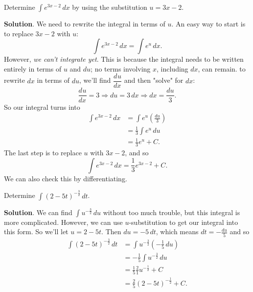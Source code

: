 \documentclass[10pt,]{book}
\theoremstyle{ptxplainnotitle}
\theoremstyle{ptxplaintitle}
\theoremstyle{ptxplainnotitle}
\theoremstyle{ptxplaintitle}
\theoremstyle{ptxplainnotitle}
\theoremstyle{ptxplaintitle}
\theoremstyle{ptxdefinitionnotitle}
\theoremstyle{ptxdefinitiontitle}
\theoremstyle{ptxdefinitionnotitle}
\theoremstyle{ptxdefinitiontitle}
\theoremstyle{ptxdefinitionnotitle}
\theoremstyle{ptxdefinitiontitle}
\theoremstyle{ptxdefinitionnotitle}
\theoremstyle{ptxdefinitiontitle}
\theoremstyle{ptxdefinitionnotitle}
\theoremstyle{ptxdefinitiontitle}
\numberwithin{equation}{section}
\newcommand{\dv}[3][]{\dfrac{d^{#1} #2}{d #3^{#1}}}
\begin{document}
%
\begin{example}\label{example-a-simple-substitution}
\hypertarget{p-481}{}%
Determine \(\int e^{3x - 2}\,dx\) by using the substitution \(u = 3x - 2\).%
\par\smallskip%
\noindent\textbf{Solution}.\hypertarget{solution-105}{}\quad%
\hypertarget{p-482}{}%
We need to rewrite the integral in terms of \(u\). An easy way to start is to replace \(3x-2\) with \(u\):%
\begin{equation*}
\int e^{3x-2}\,dx = \int e^{u}\,dx.
\end{equation*}
However, \emph{we can't integrate yet}. This is because the integral needs to be written entirely in terms of \(u\) and \(du\); no terms involving \(x\), including \(dx\), can remain. to rewrite \(dx\) in terms of \(du\), we'll find \(\dv{u}{x}\) and then "solve" for \(dx\):%
\begin{equation*}
\dv{u}{x} = 3 \Rightarrow du = 3\,dx \Rightarrow dx = \frac{du}{3}.
\end{equation*}
So our integral turns into%
\begin{align*}
\int e^{3x-2}\,dx & = \int e^{u}\left(\frac{du}{3}\right) \\
& = \frac{1}{3}\int e^{u}\,du \\
& = \frac{1}{3}e^{u} + C. 
\end{align*}
The last step is to replace \(u\) with \(3x-2\), and so%
\begin{equation*}
\int e^{3x-2}\,dx = \frac{1}{3}e^{3x-2} + C.
\end{equation*}
We can also check this by differentiating.%
\end{example}
\begin{example}\label{example-simplifying-an-integral-with-substitution}
\hypertarget{p-483}{}%
Determine \(\int(2 - 5t)^{-\frac{3}{2}}\,dt\).%
\par\smallskip%
\noindent\textbf{Solution}.\hypertarget{solution-106}{}\quad%
\hypertarget{p-484}{}%
We can find \(\int u^{-\frac{3}{2}}\,du\) without too much trouble, but this integral is more complicated. However, we can use \(u\)-substitution to get our integral into this form. So we'll let \(u = 2 - 5t\). Then \(du = -5\,dt\), which means \(dt = -\frac{du}{5}\) and so%
\begin{align*}
\int(2-5t)^{-\frac{3}{2}}\,dt & = \int u^{-\frac{3}{2}}\left(-\frac{1}{5}\,du\right) \\
& = -\frac{1}{5}\int u^{-\frac{3}{2}}\,du \\
& = \frac{1}{5}\frac{2}{1}u^{-\frac{1}{2}} + C \\
& = \frac{2}{5}(2 - 5t)^{-\frac{1}{2}} + C. 
\end{align*}
%
\end{example}
\end{document}
